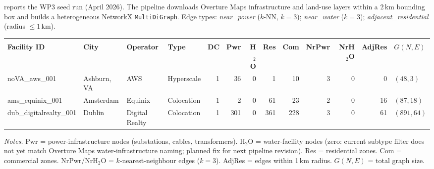  reports the WP3 seed run (April 2026). The pipeline downloads
Overture Maps infrastructure and land-use layers within a 2\,km bounding box and
builds a heterogeneous NetworkX \texttt{MultiDiGraph}. Edge types: \textit{near\_power}
($k$-NN, $k{=}3$); \textit{near\_water} ($k{=}3$); \textit{adjacent\_residential}
(radius $\leq 1$\,km).

\begin{fullwidth}
\footnotesize
{}
\setlength{\tabcolsep}{4pt}
\renewcommand{\arraystretch}{1.3}
\begin{adjustbox}{max width=\linewidth}
\begin{tabular}{%
  >{\ttfamily\raggedright}p{4.4cm}
  >{\raggedright}p{2.0cm}
  >{\raggedright}p{2.2cm}
  >{\raggedright}p{1.7cm}
  rrrrrrrr
  >{\centering\arraybackslash}p{1.5cm}}
\toprule
\rowcolor{dcblue}
\multicolumn{4}{c}{\textcolor{white}{\textbf{Facility}}} &
\multicolumn{5}{c}{\textcolor{white}{\textbf{Nodes}}} &
\multicolumn{3}{c}{\textcolor{white}{\textbf{Edges}}} &
\multicolumn{1}{c}{\textcolor{white}{\textbf{Graph}}} \\
\cmidrule(lr){1-4}\cmidrule(lr){5-9}\cmidrule(lr){10-12}\cmidrule(lr){13-13}
\textbf{Facility ID} & \textbf{City} & \textbf{Operator} & \textbf{Type} &
\textbf{DC} & \textbf{Pwr} & \textbf{H$_2$O} & \textbf{Res} & \textbf{Com} &
\textbf{NrPwr} & \textbf{NrH$_2$O} & \textbf{AdjRes} &
$G(N,E)$ \\
\midrule
noVA\_aws\_001 & Ashburn, VA & AWS & Hyperscale &
  1 & 36 & 0 & 1 & 10 & 3 & 0 & 0 &
  $(48,3)$ \\
\addlinespace[2pt]
\rowcolor{dcgray}
ams\_equinix\_001 & Amsterdam & Equinix & Colocation &
  1 & 2 & 0 & 61 & 23 & 2 & 0 & 16 &
  $(87,18)$ \\
\addlinespace[2pt]
dub\_digitalrealty\_001 & Dublin & Digital Realty & Colocation &
  1 & 301 & 0 & 361 & 228 & 3 & 0 & 61 &
  $(891,64)$ \\
\bottomrule
\end{tabular}
\end{adjustbox}
\vspace{0.4em}
\begin{flushleft}
\footnotesize\textit{Notes.} Pwr = power-infrastructure nodes (substations, cables,
transformers). H$_2$O = water-facility nodes (zero: current subtype filter does not
yet match Overture Maps water-infrastructure naming; planned fix for next pipeline
revision). Res = residential zones. Com = commercial zones. NrPwr/NrH$_2$O =
$k$-nearest-neighbour edges ($k{=}3$). AdjRes = edges within 1\,km radius.
$G(N,E)$ = total graph size.
\end{flushleft}
\end{fullwidth}

